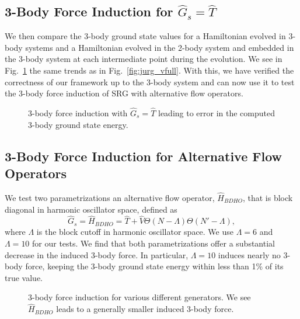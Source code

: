 \subsection{3-Body Force Induction for $\hat{G}_s=\hat{T}$}

We then compare the 3-body ground state values for a Hamiltonian evolved in 3-body systems and a Hamiltonian evolved in the 2-body system and embedded in the 3-body system at each intermediate point during the evolution. We see in Fig.~\ref{fig:heinz_vfull} the same trends as in Fig.~\ref{fig:jurg_vfull}. With this, we have verified the correctness of our framework up to the 3-body system and can now use it to test the 3-body force induction of SRG with alternative flow operators.

\begin{figure}[t]
\begin{center}
\end{center}
\caption{3-body force induction with $\hat{G}_s=\hat{T}$ leading to error in the computed 3-body ground state energy.}
\label{fig:heinz_vfull}
\end{figure}

\subsection{3-Body Force Induction for Alternative Flow Operators}

We test two parametrizations an alternative flow operator, $\hat{H}_{BDHO}$, that is block diagonal in harmonic oscillator space, defined as
\begin{equation}
\hat{G}_s = \hat{H}_{BDHO} = \hat{T} + \hat{V} \Theta(N - \Lambda) \Theta(N' - \Lambda),
\end{equation}
where $\Lambda$ is the block cutoff in harmonic oscillator space. We use $\Lambda=6$ and $\Lambda=10$ for our tests. We find that both parametrizations offer a substantial decrease in the induced 3-body force. In particular, $\Lambda=10$ induces nearly no 3-body force, keeping the 3-body ground state energy within less than 1\% of its true value.

\begin{figure}[th!]
\begin{center}
\end{center}
\caption{3-body force induction for various different generators. We see $\hat{H}_{BDHO}$ leads to a generally smaller induced 3-body force.}
\label{fig:heinz_newfull}
\end{figure}

